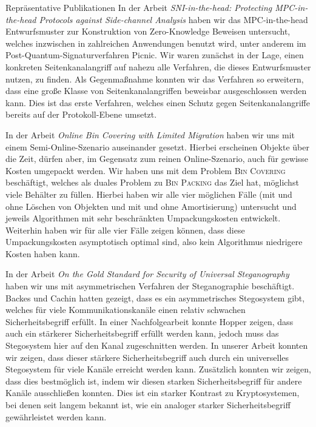 \begin{rubric}{Repräsentative Publikationen}
  \entry*[CCS 2020] In der Arbeit \emph{SNI-in-the-head: Protecting MPC-in-the-head Protocols against Side-channel Analysis} haben wir das MPC-in-the-head Entwurfsmuster zur Konstruktion von Zero-Knowledge Beweisen untersucht, welches inzwischen in zahlreichen Anwendungen benutzt wird, unter anderem im Post-Quantum-Signaturverfahren \textsf{Picnic}. Wir waren zunächst in der Lage, einen konkreten Seitenkanalangriff auf nahezu alle Verfahren, die dieses Entwurfsmuster nutzen, zu finden. Als Gegenmaßnahme konnten wir das Verfahren so erweitern, dass eine große Klasse von Seitenkanalangriffen beweisbar ausgeschlossen werden kann. Dies ist das erste Verfahren, welches einen Schutz gegen Seitenkanalangriffe bereits auf der Protokoll-Ebene umsetzt.

  \entry*[ESA 2019] In der Arbeit \emph{Online Bin Covering with Limited Migration} haben wir uns mit einem Semi-Online-Szenario auseinander gesetzt. Hierbei erscheinen Objekte über die Zeit, dürfen aber, im Gegensatz zum reinen Online-Szenario, auch für gewisse Kosten umgepackt werden. Wir haben uns mit dem Problem \textsc{Bin Covering} beschäftigt, welches als duales Problem zu \textsc{Bin Packing} das Ziel hat, möglichst viele Behälter zu füllen. Hierbei haben wir alle vier möglichen Fälle (mit und ohne Löschen von Objekten und mit und ohne Amortisierung) untersucht und jeweils Algorithmen mit sehr beschränkten Umpackungskosten entwickelt. Weiterhin haben wir für alle vier Fälle zeigen können, dass diese Umpackungskosten asymptotisch optimal sind, also kein Algorithmus niedrigere Kosten haben kann.


  \entry*[EUROCRYPT 2018] In der Arbeit \emph{On the Gold Standard for Security of Universal Steganography} haben wir uns mit asymmetrischen Verfahren der Steganographie beschäftigt. Backes und Cachin hatten gezeigt, dass es ein asymmetrisches Stegosystem gibt, welches für viele Kommunikationskanäle einen relativ schwachen Sicherheitsbegriff erfüllt. In einer Nachfolgearbeit konnte Hopper zeigen, dass auch ein stärkerer Sicherheitsbegriff erfüllt werden kann, jedoch muss das Stegosystem hier auf den Kanal zugeschnitten werden. In unserer Arbeit konnten wir zeigen, dass dieser stärkere Sicherheitsbegriff auch durch ein universelles Stegosystem für viele Kanäle erreicht werden kann. Zusätzlich konnten wir zeigen, dass dies bestmöglich ist, indem wir diesen starken Sicherheitsbegriff für andere Kanäle ausschließen konnten. Dies ist ein starker Kontrast zu Kryptosystemen, bei denen seit langem bekannt ist, wie ein analoger starker Sicherheitsbegriff gewährleistet werden kann. 


\end{rubric}

